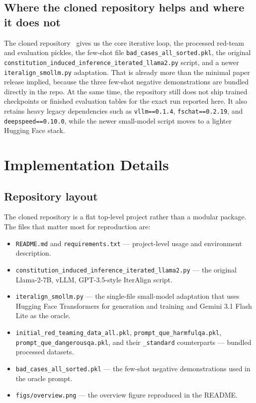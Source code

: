 \documentclass[11pt]{article}
\begin{document}
\subsection{Where the cloned repository helps and where it does not}
The cloned repository~\cite{iteralignrepo} gives us the core iterative loop, the processed red-team and evaluation pickles, the few-shot file \texttt{bad\_cases\_all\_sorted.pkl}, the original \texttt{constitution\_induced\_inference\_iterated\_llama2.py} script, and a newer \texttt{iteralign\_smollm.py} adaptation. That is already more than the minimal paper release implied, because the three few-shot negative demonstrations are bundled directly in the repo. At the same time, the repository still does not ship trained checkpoints or finished evaluation tables for the exact run reported here. It also retains heavy legacy dependencies such as \texttt{vllm==0.1.4}, \texttt{fschat==0.2.19}, and \texttt{deepspeed==0.10.0}, while the newer small-model script moves to a lighter Hugging Face stack.

\section{Implementation Details}
\label{sec:impl}

\subsection{Repository layout}
The cloned repository is a flat top-level project rather than a modular package. The files that matter most for reproduction are:
\begin{itemize}
  \item \texttt{README.md} and \texttt{requirements.txt} --- project-level usage and environment description.
  \item \texttt{constitution\_induced\_inference\_iterated\_llama2.py} --- the original Llama-2-7B, vLLM, GPT-3.5-style IterAlign script.
  \item \texttt{iteralign\_smollm.py} --- the single-file small-model adaptation that uses Hugging Face Transformers for generation and training and Gemini 3.1 Flash Lite as the oracle.
  \item \texttt{initial\_red\_teaming\_data\_all.pkl}, \texttt{prompt\_que\_harmfulqa.pkl}, \texttt{prompt\_que\_dangerousqa.pkl}, and their \texttt{\_standard} counterparts --- bundled processed datasets.
  \item \texttt{bad\_cases\_all\_sorted.pkl} --- the few-shot negative demonstrations used in the oracle prompt.
  \item \texttt{figs/overview.png} --- the overview figure reproduced in the README.
\end{itemize}
\end{document}
